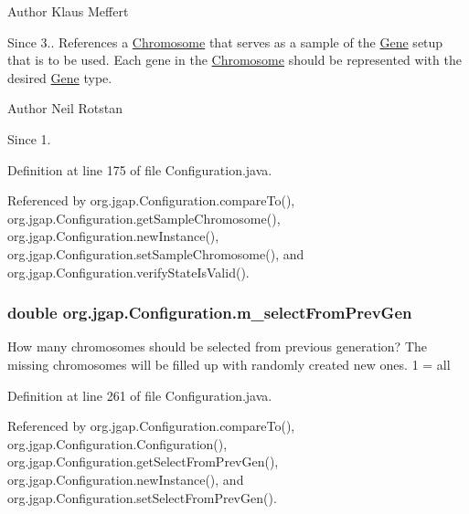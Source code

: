 \begin{DoxyAuthor}{Author}
Klaus Meffert 
\end{DoxyAuthor}
\begin{DoxySince}{Since}
3.. References a \hyperlink{classorg_1_1jgap_1_1_chromosome}{Chromosome} that serves as a sample of the \hyperlink{interfaceorg_1_1jgap_1_1_gene}{Gene} setup that is to be used. Each gene in the \hyperlink{classorg_1_1jgap_1_1_chromosome}{Chromosome} should be represented with the desired \hyperlink{interfaceorg_1_1jgap_1_1_gene}{Gene} type.
\end{DoxySince}
\begin{DoxyAuthor}{Author}
Neil Rotstan 
\end{DoxyAuthor}
\begin{DoxySince}{Since}
1. 
\end{DoxySince}


Definition at line 175 of file Configuration.\-java.



Referenced by org.\-jgap.\-Configuration.\-compare\-To(), org.\-jgap.\-Configuration.\-get\-Sample\-Chromosome(), org.\-jgap.\-Configuration.\-new\-Instance(), org.\-jgap.\-Configuration.\-set\-Sample\-Chromosome(), and org.\-jgap.\-Configuration.\-verify\-State\-Is\-Valid().

\hypertarget{classorg_1_1jgap_1_1_configuration_a7514f1eb7143283292cf85bd946bebfc}{
\subsubsection[{m\-\_\-select\-From\-Prev\-Gen}]{\setlength{\rightskip}{0pt plus 5cm}double org.\-jgap.\-Configuration.\-m\-\_\-select\-From\-Prev\-Gen\hspace{0.3cm}{\ttfamily [private]}}}\label{classorg_1_1jgap_1_1_configuration_a7514f1eb7143283292cf85bd946bebfc}
How many chromosomes should be selected from previous generation? The missing chromosomes will be filled up with randomly created new ones. 1 = all 

Definition at line 261 of file Configuration.\-java.



Referenced by org.\-jgap.\-Configuration.\-compare\-To(), org.\-jgap.\-Configuration.\-Configuration(), org.\-jgap.\-Configuration.\-get\-Select\-From\-Prev\-Gen(), org.\-jgap.\-Configuration.\-new\-Instance(), and org.\-jgap.\-Configuration.\-set\-Select\-From\-Prev\-Gen().

